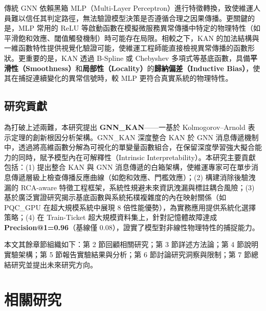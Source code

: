 \documentclass[10pt,a4paper,twocolumn]{article}
\begin{document}
傳統 GNN 依賴黑箱 MLP（Multi-Layer Perceptron）進行特徵轉換，致使維運人員難以信任其判定路徑，無法驗證模型決策是否遵循合理之因果傳播。更關鍵的是，MLP 常用的 ReLU 等啟動函數在模擬微服務異常傳播中特定的物理特性（如平滑飽和效應、閾值觸發機制）時可能存在局限。相較之下，KAN 的加法結構與一維函數特性提供視覺化驗證可能，使維運工程師能直接檢視異常傳播的函數形狀。更重要的是，KAN 透過 B-Spline 或 Chebyshev 多項式等基底函數，具備\textbf{平滑性（Smoothness）}和\textbf{局部性（Locality）}的\textbf{歸納偏差（Inductive Bias）}，使其在捕捉連續變化的異常信號時，較 MLP 更符合真實系統的物理特性。

\subsection{研究貢獻}

為打破上述兩難，本研究提出 \textbf{GNN\_KAN}——一基於 Kolmogorov–Arnold 表示定理的創新根因分析架構。GNN\_KAN 深度整合 KAN 於 GNN 消息傳遞機制中，透過將高維函數分解為可視化的單變量函數組合，在保留深度學習強大擬合能力的同時，賦予模型內在可解釋性（Intrinsic Interpretability）。本研究主要貢獻包括：(1) 提出整合 KAN 與 GNN 消息傳遞的白箱架構，使維運專家可在單步消息傳遞層級上檢查傳播反應曲線（如飽和效應、門檻效應）；(2) 構建消除後驗洩漏的 RCA-aware 特徵工程框架，系統性規避未來資訊洩漏與標註耦合風險；(3) 基於廣泛實證研究揭示基底函數與系統拓樸複雜度的內在映射關係（如 PQC\_GPU 在超大規模系統中展現 8 倍性能優勢），為實務應用提供系統化選擇策略；(4) 在 Train-Ticket 超大規模資料集上，針對記憶體故障達成 \textbf{Precision@1=0.96}（基線僅 0.08），證實了模型對非線性物理特性的捕捉能力。

本文其餘章節組織如下：第 2 節回顧相關研究；第 3 節詳述方法論；第 4 節說明實驗架構；第 5 節報告實驗結果與分析；第 6 節討論研究洞察與限制；第 7 節總結研究並提出未來研究方向。

\section{相關研究}
\end{document}
